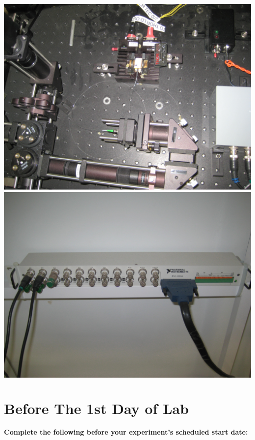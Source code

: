 \documentclass{../lab}
\begin{document}
\href{http://experimentationlab.berkeley.edu/sites/default/files/images/OTZ_Laser_3550.jpg}{\includegraphics[width=0.33\linewidth,keepaspectratio]{images/OTZ_Laser_3550.jpg}}
\href{http://experimentationlab.berkeley.edu/sites/default/files/images/OTZ_DAQ_Interface_3554.jpg}{\includegraphics[width=0.33\linewidth,keepaspectratio]{images/OTZ_DAQ_Interface_3554.jpg}}

\section{Before The 1st Day of Lab}

\textbf{Complete the following before your experiment's scheduled start date:}
\end{document}
